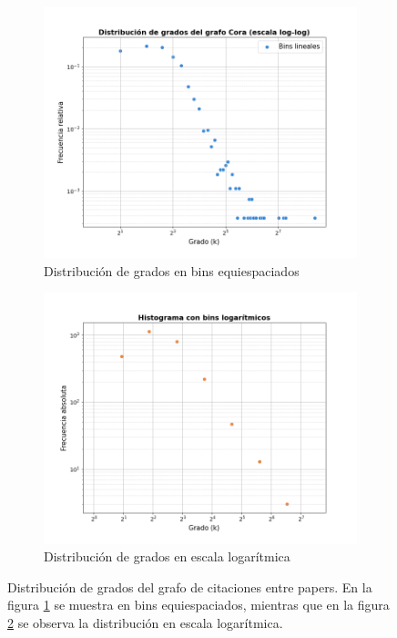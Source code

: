 \documentclass{article}
\begin{document}
\begin{figure}
    \centering
    \begin{subfigure}[b]{0.48\textwidth}
        \centering
        \includegraphics[width=\textwidth]{imagenes/dist_grado_Cora_lineal.png}
        \caption{Distribución de grados en bins equiespaciados}
        \label{fig: degree_distribution_lineal}
    \end{subfigure}
    \hfill
    \begin{subfigure}[b]{0.48\textwidth}
        \centering
        \includegraphics[width=\textwidth]{imagenes/dist_grado_Cora_log.png}
        \caption{Distribución de grados en escala logarítmica}
        \label{fig: degree_distribution_log}
    \end{subfigure}
    \caption{Distribución de grados del grafo de citaciones entre papers. En la figura \ref{fig: degree_distribution_lineal} se muestra en bins equiespaciados, mientras que en la figura \ref{fig: degree_distribution_log} se observa la distribución en escala logarítmica.}
    \label{fig: degree_distribution}
\end{figure}
\end{document}
